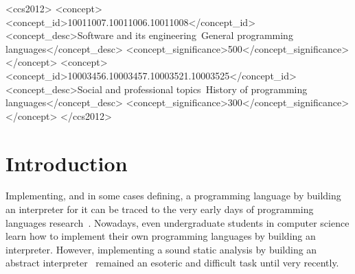 \documentclass[acmsmall, review]{acmart}\settopmatter{}
\begin{document}
\begin{CCSXML}
<ccs2012>
  <concept>
    <concept_id>10011007.10011006.10011008</concept_id>
    <concept_desc>Software and its engineering~General programming languages</concept_desc>
    <concept_significance>500</concept_significance>
  </concept>
  <concept>
    <concept_id>10003456.10003457.10003521.10003525</concept_id>
    <concept_desc>Social and professional topics~History of programming languages</concept_desc>
    <concept_significance>300</concept_significance>
  </concept>
</ccs2012>
\end{CCSXML}




\maketitle


\section{Introduction}
\vspace{-0.7ex}

Implementing, and in some cases defining, a programming language by building an 
interpreter for it can be traced to the very early days of programming languages 
research~\cite{McCarthy:1960:RFS:367177.367199,landin1966next,Reynolds:72}.
Nowadays, even undergraduate students in computer science learn how to implement
their own programming languages by building an interpreter.
However, implementing a sound static analysis by building an
abstract interpreter~\cite{cousot1977abstract} remained an esoteric and difficult 
task until very recently.
\end{document}
